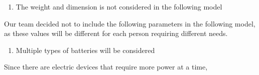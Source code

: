 \begin{enumerate}
    \item The weight and dimension is not considered in the following model
\end{enumerate}
Our team decided not to include the following parameters in the following model, as these values will be different for each person requiring different needs.
\begin{enumerate}[resume]
    \item Multiple types of batteries will be considered
\end{enumerate}
Since there are electric devices that require more power at a time, 